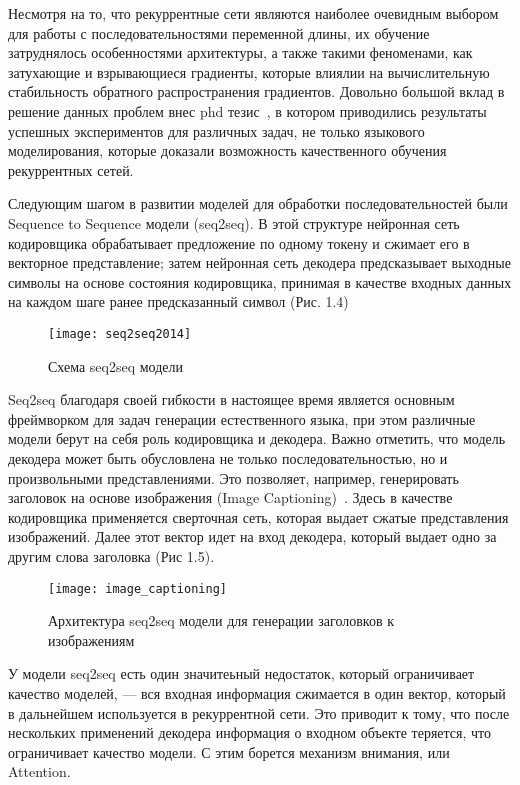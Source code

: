 Несмотря на то, что рекуррентные сети являются наиболее очевидным выбором для работы с последовательностями переменной длины, их обучение затруднялось особенностями архитектуры, а также такими феноменами, как затухающие и взрывающиеся градиенты, которые влиялии на вычислительную стабильность обратного распространения градиентов. Довольно большой вклад в решение данных проблем внес phd тезис~\cite{sutskever2013training}, в котором приводились результаты успешных экспериментов для различных задач, не только языкового моделирования, которые доказали возможность качественного обучения рекуррентных сетей.

Следующим шагом в развитии моделей для обработки последовательностей были Sequence to Sequence модели (seq2seq). В этой структуре нейронная сеть кодировщика обрабатывает предложение по одному токену и сжимает его в векторное представление; затем нейронная сеть декодера предсказывает выходные символы на основе состояния кодировщика, принимая в качестве входных данных на каждом шаге ранее предсказанный символ (Рис. 1.4)

\begin{figure}[ht]
	\centering
	\texttt{[image: seq2seq2014]}  
	\caption{ Схема seq2seq модели }
\end{figure}

Seq2seq благодаря своей гибкости в настоящее время является основным фреймворком для задач генерации естественного языка, при этом различные модели берут на себя роль кодировщика и декодера. Важно отметить, что модель декодера может быть обусловлена не только последовательностью, но и произвольными представлениями. Это позволяет, например, генерировать заголовок на основе изображения (Image Captioning)~\cite{image-captioning}. Здесь в качестве кодировщика применяется сверточная сеть, которая выдает сжатые представления изображений. Далее этот вектор идет на вход декодера, который выдает одно за другим слова заголовка (Рис 1.5).
\begin{figure}[ht]
	\centering
	\texttt{[image: image\_captioning]}  
	\caption{ Архитектура seq2seq модели для генерации заголовков к изображениям }
\end{figure}

У модели seq2seq есть один значитеьный недостаток, который ограничивает качество моделей, --- вся входная информация сжимается в один вектор, который в дальнейшем используется в рекуррентной сети. Это приводит к тому, что после нескольких применений декодера информация о входном объекте теряется, что ограничивает качество модели. С этим борется механизм внимания, или Attention.

